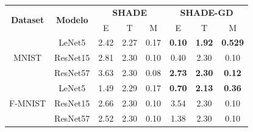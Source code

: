 \begin{table}[]
\centering
\begin{tabular}{|c|c|ccc|ccc|}
\hline
\multirow{2}{*}{\textbf{Dataset}} & \multirow{2}{*}{\textbf{Modelo}} & \multicolumn{3}{c|}{\textbf{SHADE}}                                                     & \multicolumn{3}{c|}{\textbf{SHADE-GD}}                                                   \\ \cline{3-8} 
                                  &                                 & \multicolumn{1}{c|}{E}             & \multicolumn{1}{c|}{T}             & M             & \multicolumn{1}{c|}{E}             & \multicolumn{1}{c|}{T}             & M              \\ \hline
\multirow{3}{*}{MNIST}            & LeNet5                          & \multicolumn{1}{c|}{2.42}          & \multicolumn{1}{c|}{2.27}          & 0.17          & \multicolumn{1}{c|}{\textbf{0.10}} & \multicolumn{1}{c|}{\textbf{1.92}} & \textbf{0.529} \\ \cline{2-8} 
                                  & ResNet15                        & \multicolumn{1}{c|}{2.81}          & \multicolumn{1}{c|}{2.30}          & 0.10          & \multicolumn{1}{c|}{0.40}          & \multicolumn{1}{c|}{2.30}          & 0.10           \\ \cline{2-8} 
                                  & ResNet57                        & \multicolumn{1}{c|}{3.63}          & \multicolumn{1}{c|}{2.30}          & 0.08          & \multicolumn{1}{c|}{\textbf{2.73}} & \multicolumn{1}{c|}{\textbf{2.30}} & \textbf{0.12}  \\ \hline
\multirow{3}{*}{F-MNIST}          & LeNet5                          & \multicolumn{1}{c|}{1.49}          & \multicolumn{1}{c|}{2.29}          & 0.17          & \multicolumn{1}{c|}{\textbf{0.70}} & \multicolumn{1}{c|}{\textbf{2.13}} & \textbf{0.36}  \\ \cline{2-8} 
                                  & ResNet15                        & \multicolumn{1}{c|}{2.66}          & \multicolumn{1}{c|}{2.30}          & 0.10          & \multicolumn{1}{c|}{3.54}          & \multicolumn{1}{c|}{2.30}          & 0.10           \\ \cline{2-8} 
                                  & ResNet57                        & \multicolumn{1}{c|}{2.52}          & \multicolumn{1}{c|}{2.30}          & 0.10          & \multicolumn{1}{c|}{1.38}          & \multicolumn{1}{c|}{2.30}          & 0.10           \\ \hline

\end{tabular}
\end{table}
